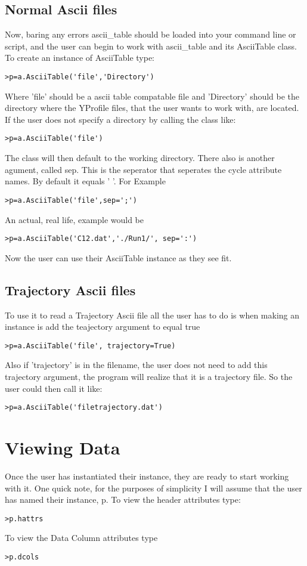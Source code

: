 \subsection{Normal Ascii files}
Now, baring any errors ascii\_table should be loaded into your command line or script, and the user can begin
to work with ascii\_table and its AsciiTable class. To create an instance of AsciiTable type:
\begin{verbatim}
>p=a.AsciiTable('file','Directory')
\end{verbatim}
Where 'file' should be a ascii table compatable file and 'Directory' should be the directory where the YProfile files, that the user wants
to work with, are located. If the user does not specify a directory by calling the class
like: 
\begin{verbatim}
>p=a.AsciiTable('file')
\end{verbatim}
The class will then default to the working directory.\newline
There also is another agument, called sep. This is the seperator that seperates the 
cycle attribute names. By default it equals '  '. For Example
\begin{verbatim}
>p=a.AsciiTable('file',sep=';')
\end{verbatim}
An actual, real life, example would be
\begin{verbatim}
>p=a.AsciiTable('C12.dat','./Run1/', sep=':')
\end{verbatim}
Now the user can use their AsciiTable instance as they see fit.
\subsection{Trajectory Ascii files}
To use it to read a Trajectory Ascii file all the user has to do is when making an instance is add the teajectory argument to equal true
\begin{verbatim}
>p=a.AsciiTable('file', trajectory=True)
\end{verbatim}
Also if 'trajectory' is in the filename, the user does not need to add this trajectory argument, 
the program will realize that it is a trajectory file. So the user could then call it like:
\begin{verbatim}
>p=a.AsciiTable('filetrajectory.dat')
\end{verbatim}

\section{Viewing Data}
Once the user has instantiated their instance, they are ready to start working with it.
One quick note, for the purposes of simplicity I will assume that the user has named
their instance, p.
\newline
To view the header attributes type:
\begin{verbatim}
>p.hattrs
\end{verbatim}
To view the Data Column attributes type
\begin{verbatim}
>p.dcols
\end{verbatim}

